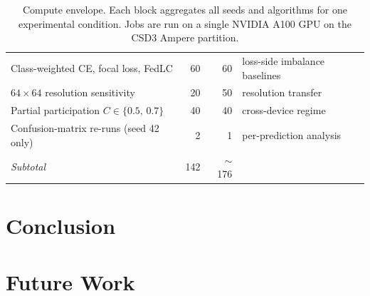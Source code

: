 \documentclass[11pt,a4paper]{article}
\begin{document}
\begin{table}[!htbp]
\begin{tabular}{@{}l r r l@{}}
Class-weighted CE, focal loss, FedLC                  & 60  & 60 & loss-side imbalance baselines \\
$64 \times 64$ resolution sensitivity                 & 20  & 50 & resolution transfer \\
Partial participation $C \in \{0.5,\,0.7\}$           & 40  & 40 & cross-device regime \\
Confusion-matrix re-runs (seed 42 only)               &  2  &  1 & per-prediction analysis \\
\addlinespace[1pt]
\quad\emph{Subtotal}                                  & 142 & $\sim$176 & \\
\bottomrule
\end{tabular}
\caption{Compute envelope. Each block aggregates all seeds and
algorithms for one experimental condition. Jobs are run on a single
NVIDIA A100 GPU on the CSD3 Ampere partition.}
\label{tab:resources}
\end{table}

\section{Conclusion}\label{sec:conclusion}

\section{Future Work}\label{sec:future}
\end{document}
